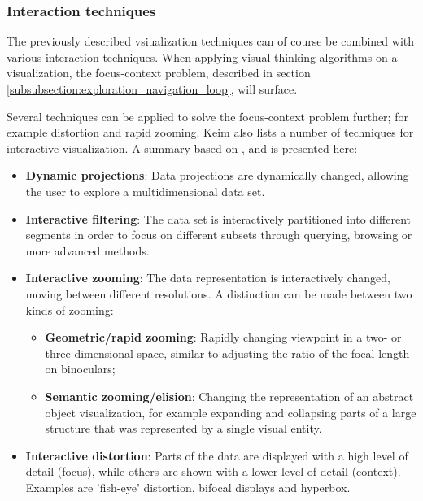 


\subsubsection{Interaction techniques}\label{chapter:literature_study:section:interaction:subsection:techniques:subsubsection:interaction}

The previously described vsiualization techniques can of course be combined with various interaction techniques\cite{keim:2002}. When applying visual thinking algorithms on a visualization, the focus-context problem, described in section \ref{subsubsection:exploration_navigation_loop}, will surface.

Several techniques can be applied to solve the focus-context problem further; for example distortion and rapid zooming\cite{ware:2004}. Keim \cite{keim:2002} also lists a number of techniques for interactive visualization. A summary based on \cite{ware:2004}, \cite{shirley:2009} and \cite{keim:2002} is presented here:

\begin{itemize}
	\item \textbf{Dynamic projections}: Data projections are dynamically changed, allowing the user to explore a multidimensional data set.
	\item \textbf{Interactive filtering}: The data set is interactively partitioned into different segments in order to focus on different subsets through querying, browsing or more advanced methods.
	\item \textbf{Interactive zooming}: The data representation is interactively changed, moving between different resolutions. A distinction can be made between two kinds of zooming\cite{shirley:2009, ware:2004}:
	\begin{itemize}
		\item \textbf{Geometric/rapid zooming}: Rapidly changing viewpoint in a two- or three-dimensional space, similar to adjusting the ratio of the focal length on binoculars;
		\item \textbf{Semantic zooming/elision}: Changing the representation of an abstract object visualization, for example expanding and collapsing parts of a large structure that was represented by a single visual entity.
	\end{itemize}
	\item \textbf{Interactive distortion}: Parts of the data are displayed with a high level of detail (focus), while others are shown with a lower level of detail (context). Examples are 'fish-eye' distortion, bifocal displays and hyperbox.
\end{itemize}


